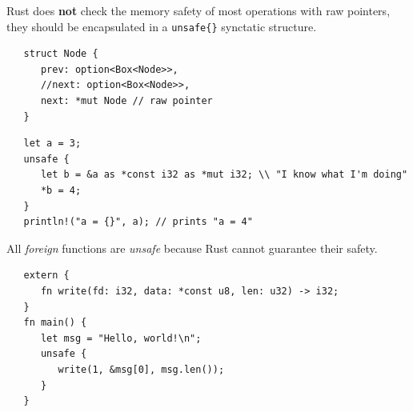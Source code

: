 Rust does \textbf{not} check the memory safety of most operations with raw pointers, they should be encapsulated in a \lstinline|unsafe{}| synctatic structure.
\begin{lstlisting}
   struct Node {
      prev: option<Box<Node>>,
      //next: option<Box<Node>>,
      next: *mut Node // raw pointer
   }
\end{lstlisting}

\begin{lstlisting}
   let a = 3;
   unsafe {
      let b = &a as *const i32 as *mut i32; \\ "I know what I'm doing"
      *b = 4;
   }
   println!("a = {}", a); // prints "a = 4"
\end{lstlisting}

All \textit{foreign} functions are \textit{unsafe} because Rust cannot guarantee their safety.

\begin{lstlisting}
   extern {
      fn write(fd: i32, data: *const u8, len: u32) -> i32;
   }
   fn main() {
      let msg = "Hello, world!\n";
      unsafe {
         write(1, &msg[0], msg.len());
      }
   }
\end{lstlisting}